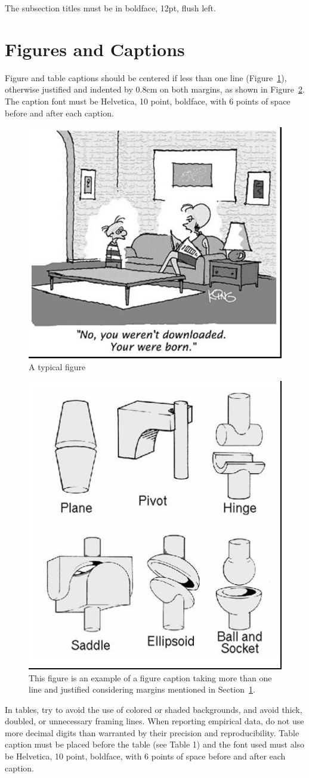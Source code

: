 \documentclass[12pt]{article}
\begin{document}
The subsection titles must be in boldface, 12pt, flush left.

\section{Figures and Captions}\label{sec:figs}


Figure and table captions should be centered if less than one line
(Figure~\ref{fig:exampleFig1}), otherwise justified and indented by 0.8cm on
both margins, as shown in Figure~\ref{fig:exampleFig2}. The caption font must
be Helvetica, 10 point, boldface, with 6 points of space before and after each
caption.

\begin{figure}[ht]
\centering
\includegraphics[width=.5\textwidth]{fig1.jpg}
\caption{A typical figure}
\label{fig:exampleFig1}
\end{figure}

\begin{figure}[ht]
\centering
\includegraphics[width=.3\textwidth]{fig2.jpg}
\caption{This figure is an example of a figure caption taking more than one
  line and justified considering margins mentioned in Section~\ref{sec:figs}.}
\label{fig:exampleFig2}
\end{figure}

In tables, try to avoid the use of colored or shaded backgrounds, and avoid
thick, doubled, or unnecessary framing lines. When reporting empirical data,
do not use more decimal digits than warranted by their precision and
reproducibility. Table caption must be placed before the table (see Table 1)
and the font used must also be Helvetica, 10 point, boldface, with 6 points of
space before and after each caption.
\end{document}
